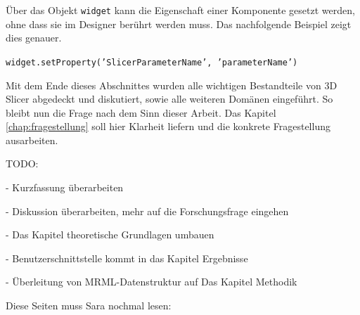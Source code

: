 Über das Objekt \texttt{widget} kann die Eigenschaft einer Komponente gesetzt
werden, ohne dass sie im Designer berührt werden muss. Das nachfolgende Beispiel
zeigt dies genauer.
\begin{center}
	\texttt{widget.setProperty('SlicerParameterName', 'parameterName')}
\end{center}
Mit dem Ende dieses Abschnittes wurden alle wichtigen Bestandteile von 3D Slicer
abgedeckt und diskutiert, sowie alle weiteren Domänen eingeführt. So bleibt nun die
Frage nach dem Sinn dieser Arbeit. Das Kapitel \ref{chap:fragestellung} soll
hier Klarheit liefern und die konkrete Fragestellung ausarbeiten.

TODO:

- Kurzfassung überarbeiten

- Diskussion überarbeiten, mehr auf die Forschungsfrage eingehen

- Das Kapitel theoretische Grundlagen umbauen

- Benutzerschnittstelle kommt in das Kapitel Ergebnisse

- Überleitung von MRML-Datenstruktur auf Das Kapitel Methodik

Diese Seiten muss Sara nochmal lesen: